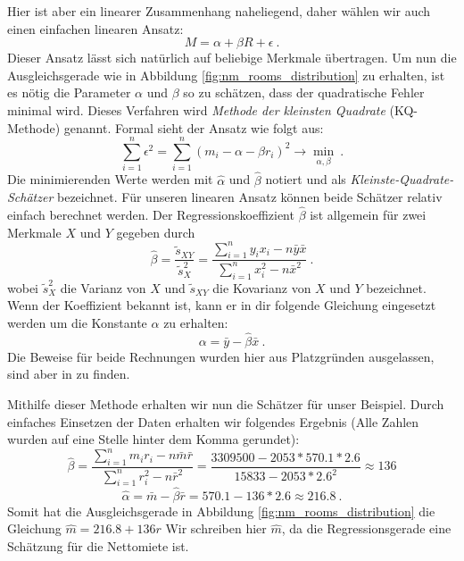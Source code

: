 Hier ist aber ein linearer Zusammenhang naheliegend, daher wählen wir auch einen einfachen linearen Ansatz:
\begin{equation*}
  M = \alpha + \beta R + \epsilon ~.
\end{equation*}
Dieser Ansatz lässt sich natürlich auf beliebige Merkmale übertragen.
Um nun die Ausgleichsgerade wie in Abbildung \ref{fig:nm_rooms_distribution} zu erhalten, ist es nötig die Parameter $\alpha$ und $\beta$ so zu schätzen, dass der quadratische Fehler minimal wird.
Dieses Verfahren wird  \textit{Methode der kleinsten Quadrate} (KQ-Methode) genannt.
Formal sieht der Ansatz wie folgt aus:
\begin{equation*}
  \sum\limits_{i=1}^{n} \epsilon^2 = \sum\limits_{i=1}^{n} (m_i - \alpha - \beta r_i)^2 \rightarrow \min\limits_{\alpha, \beta} ~.
\end{equation*}
Die minimierenden Werte werden mit $\hat\alpha$ und $\hat\beta$ notiert und als \textit{Kleinste-Quadrate-Schätzer} bezeichnet.
Für unseren linearen Ansatz können beide Schätzer relativ einfach berechnet werden.
Der Regressionskoeffizient $\hat\beta$ ist allgemein für zwei Merkmale $X$ und $Y$ gegeben durch
\begin{equation*}
  \hat\beta = \frac{\tilde s_{XY}}{\tilde{s}^2_X} = \frac{\sum\limits_{i=1}^{n} y_i x_i - n \bar y \bar x}{\sum\limits_{i=1}^{n} x_i^2 - n \bar{x}^2} ~.
\end{equation*}
wobei $\tilde{s}^2_X$ die Varianz von $X$ und $\tilde s_{XY}$ die Kovarianz von $X$ und $Y$ bezeichnet. 
Wenn der Koeffizient bekannt ist, kann er in dir folgende Gleichung eingesetzt werden um die Konstante $\alpha$ zu erhalten:
\begin{equation*}
  \alpha = \bar y - \hat\beta \bar x ~.
\end{equation*}
Die Beweise für beide Rechnungen wurden hier aus Platzgründen ausgelassen, sind aber in \citet[S. 155]{Fahrmeir2010} zu finden.

Mithilfe dieser Methode erhalten wir nun die Schätzer für unser Beispiel.
Durch einfaches Einsetzen der Daten erhalten wir folgendes Ergebnis (Alle Zahlen wurden auf eine Stelle hinter dem Komma gerundet):
\begin{equation*}
  \hat\beta = \frac{\sum\limits_{i=1}^{n} m_i r_i - n \bar m \bar r}{\sum\limits_{i=1}^{n} r_i^2 - n \bar{r}^2}
  = \frac{3309500 - 2053 * 570.1 * 2.6}{15833 - 2053 * 2.6^2}
  \approx 136
\end{equation*}
\begin{equation*}
  \hat\alpha = \bar m - \hat\beta \bar r 
  = 570.1 - 136 * 2.6 
  \approx 216.8 ~.
\end{equation*}
Somit hat die Ausgleichsgerade in Abbildung \ref{fig:nm_rooms_distribution} die Gleichung $\hat m = 216.8 + 136 r$
Wir schreiben hier $\hat m$, da die Regressionsgerade eine Schätzung für die Nettomiete ist.

